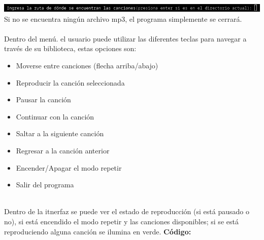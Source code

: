 \documentclass[12pt,a4paper]{article}
\begin{document}
    \centering
    \includegraphics[width=16cm]{img/musica_prompt.png}
    \\
    \justifying
    \noindent
    Si no se encuentra ningún archivo mp3, el programa simplemente se cerrará.
    \\\\
    Dentro del menú. el usuario puede utilizar las diferentes teclas para navegar a través de su biblioteca, estas opciones son:
    \begin{itemize}
        \item Moverse entre canciones (flecha arriba/abajo)
        \item Reproducir la canción seleccionada
        \item Pausar la canción
        \item Continuar con la canción
        \item Saltar a la siguiente canción
        \item Regresar a la canción anterior
        \item Encender/Apagar el modo repetir
        \item Salir del programa
    \end{itemize}
    \\
    Dentro de la itnerfaz se puede ver el estado de reproducción (si está pausado o no), si está encendido el modo repetir y las canciones disponibles; si se está reproduciendo alguna canción se ilumina en verde.
    \textbf{Código:}
    \\
\end{document}
